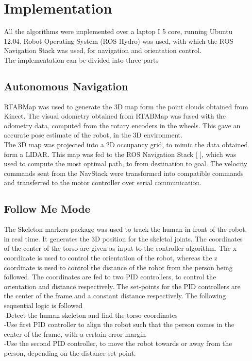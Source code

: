\documentclass[conference]{IEEEtran}
\begin{document}
\section{Implementation}
All the algorithms were implemented over a laptop I 5 core, running Ubuntu 12.04. Robot Operating System (ROS Hydro) was used, with which the ROS Navigation Stack was used, for navigation and orientation control.
\\
The implementation can be divided into three parts

\subsection{Autonomous Navigation}
RTABMap was used to generate the 3D map form the point clouds obtained from Kinect. The visual odometry obtained from RTABMap was fused with the odometry data, computed from the rotary encoders in the wheels. This gave an accurate pose estimate of the robot, in the 3D environment.
\\
The 3D map was projected into a 2D occupancy grid, to mimic the data obtained form a LIDAR. This map was fed to the ROS Navigation Stack [ ], which was used to compute the most optimal path, to from destination to goal. The velocity commands sent from the NavStack were transformed into compatible commands and transferred to the motor controller over serial communication.
\subsection{Follow Me Mode}
The Skeleton markers package was used to track the human in front of the robot, in real time. It generates the 3D position for the skeletal joints. The coordinates of the center of the torso are given as input to the controller algorithm. The x coordinate is used to control the orientation of the robot, whereas the z coordinate is used to control the distance of the robot from the person being followed. The coordinates are fed to two PID controllers, to control the orientation and distance respectively. The set-points for the PID controllers are the center of the frame and a constant distance respectively. The following sequential logic is followed\\
-Detect the human skeleton and find the torso coordinates\\
-Use first PID controller to align the robot such that the person comes in the center of the frame, with a certain error margin\\
-Use the second PID controller, to move the robot towards or away from the person, depending on the distance set-point.\\
\end{document}
